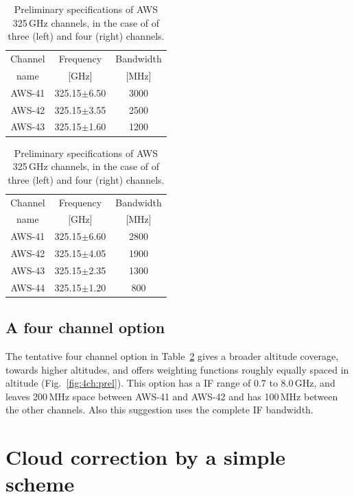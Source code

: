 \documentclass[12pt]{article}
\begin{document}
\begin{table}[!t]
  \begin{minipage}[b]{0.5\linewidth}
  \centering  
  \begin{tabular}[c]{c|c|c}
    Channel & Frequency   & Bandwidth \\
    name    & [GHz] &  [MHz] \\
    \hline
    AWS-41  & 325.15$\pm$6.50 & 3000\\
    AWS-42  & 325.15$\pm$3.55 & 2500\\
    AWS-43  & 325.15$\pm$1.60 & 1200\\
    \hline
  \end{tabular}
  \end{minipage}%
  \begin{minipage}[b]{0.5\linewidth}
  \centering  
  \begin{tabular}[c]{c|c|c}
    Channel & Frequency   & Bandwidth \\
    name    & [GHz] &  [MHz] \\
    \hline
    AWS-41  & 325.15$\pm$6.60 & 2800\\
    AWS-42  & 325.15$\pm$4.05 & 1900\\
    AWS-43  & 325.15$\pm$2.35 & 1300\\
    AWS-44  & 325.15$\pm$1.20 & \phantom{0}800\\
    \hline
  \end{tabular}
  \end{minipage}  
  \caption{Preliminary specifications of AWS 325\,GHz channels, in the case of
    of three (left) and four (right) channels.}
  \label{tab:chs:prel}
\end{table}




\subsection{A four channel option}
%
The tentative four channel option in Table~\ref{tab:chs:prel} gives a broader
altitude coverage, towards higher altitudes, and offers weighting functions
roughly equally spaced in altitude (Fig.~\ref {fig:4ch:prel}). This option has
a IF range of 0.7 to 8.0\,GHz, and leaves 200\,MHz space between AWS-41 and
AWS-42 and has 100\,MHz between the other channels. Also this suggestion uses
the complete IF bandwidth.


\section{Cloud correction by a simple scheme}
%
\end{document}

